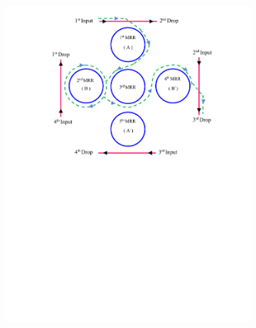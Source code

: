 \documentclass{osa-article}
\begin{document}
\begin{figure}[h!]
\begin{subfigure}[b]{0.4\linewidth}
    \includegraphics[width=\linewidth]{figs/fig4a_ID132.pdf}
    \caption{}
  \end{subfigure}
  \begin{subfigure}[b]{0.4\linewidth}

\end{subfigure}
\end{figure}
\end{document}
